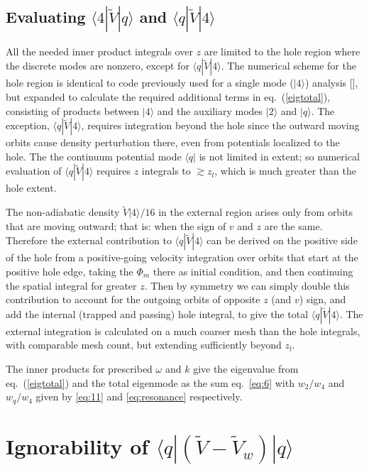 \documentclass[12pt]{article}
\def\ket#1{|#1\rangle}
\def\bra#1{\langle#1}
\begin{document}
\subsection{Evaluating $\bra{4}|\tilde{V}\ket{q}$ and $\bra{q}|\tilde{V}\ket{4}$}

All the needed inner product integrals over $z$ are limited to the
hole region where the discrete modes are nonzero, except for
$\bra{q}|\tilde V\ket{4}$.  The numerical scheme for the hole region
is identical to code previously used for a single mode ($\ket{4}$)
analysis [], but expanded to calculate the required additional terms
in eq.\ (\ref{eigtotal}), consisting of products between $\ket{4}$
and the auxiliary modes $\ket{2}$ and $\ket{q}$.  The exception,
$\bra{q}|\tilde V\ket{4}$, requires integration beyond the hole since
the outward moving orbits cause density perturbation there, even from
potentials localized to the hole. The the continuum potential mode
$\bra{q}|$ is not limited in extent; so numerical evaluation of
$\bra{q}|\tilde V\ket{4}$ requires $z$ integrals to $\gtrsim z_l$,
which is much greater than the hole extent.


The non-adiabatic density $\tilde V \ket{4}/16$ in the external region
arises only from orbits that are moving outward; that is: when the
sign of $v$ and $z$ are the same. Therefore the external contribution
to $\bra{q}|\tilde V \ket{4}$ can be derived on the positive side of
the hole from a positive-going velocity integration over orbits that
start at the positive hole edge, taking the $\Phi_m$ there as initial
condition, and then continuing the spatial integral for greater $z$.
Then by symmetry we can simply double this contribution to account for
the outgoing orbits of opposite $z$ (and $v$) sign, and add the
internal (trapped and passing) hole integral, to give the total
$\bra{q}|\tilde V \ket{4}$.  The external integration is calculated on
a much coarser mesh than the hole integrals, with comparable mesh
count, but extending sufficiently beyond $z_l$.

The inner products for prescribed $\omega$ and $k$ give the eigenvalue
from eq.\ (\ref{eigtotal}) and the total eigenmode as the sum eq.\
\ref{eq:6} with $w_2/w_4$ and $w_q/w_4$ given by \ref{eq:11} and
\ref{eq:resonance} respectively. 



\appendix
\section{Ignorability of $\bra{q}|(\tilde{V}-\tilde{V}_{w})\ket{q}$}
\label{ignorability}
\end{document}
